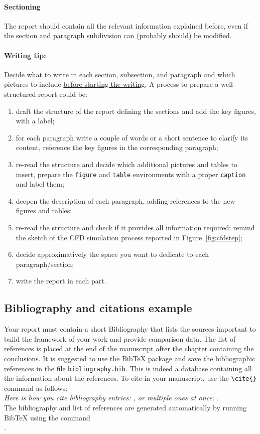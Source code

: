 \documentclass[11pt,a4paper]{article}
\begin{document}
\paragraph{Sectioning}
The report should contain all the relevant information explained before, even if the section and paragraph subdivision can (probably should) be modified. 

\paragraph{Writing tip:} \underline{Decide} what to write in each section, subsection, and paragraph and which pictures to include \underline{before starting the writing}.
A process to prepare a well-structured report could be:
\begin{enumerate}
    \item draft the structure of the report defining the sections and add the key figures, with a label;
    \item for each paragraph write a couple of words or a short sentence to clarify its content, reference the key figures in the corresponding paragraph;
    \item re-read the structure and decide which additional pictures and tables to insert, prepare the \texttt{figure} and \texttt{table} environments with a proper \texttt{caption} and label them;
    \item deepen the description of each paragraph, adding references to the new figures and tables;
    \item re-read the structure and check if it provides all information required: remind the sketch of the CFD simulation process reported in Figure~\ref{fig:cfdstep};
    \item decide approximatively the space you want to dedicate to each paragraph/section;
    \item write the report in each part.
\end{enumerate}



\subsection{Bibliography and citations example}
Your report must contain a short Bibliography that lists the sources important to build the framework of your work and provide comparison data.
The list of references is placed at the end of the manuscript after the chapter containing the conclusions.
It is suggested to use the BibTeX package and save the bibliographic references in the file \verb|bibliography.bib|.
This is indeed a database containing all the information about the references. To cite in your manuscript, use the \verb|\cite{}| command as follows:
\\
\textit{Here is how you cite bibliography entries: \cite{AroMontes}, or multiple ones at once: \cite{AroMontes,TEXT01}}.
\\
The bibliography and list of references are generated automatically by running BibTeX \cite{bibtex} using the command \\ \verb||.
\end{document}
